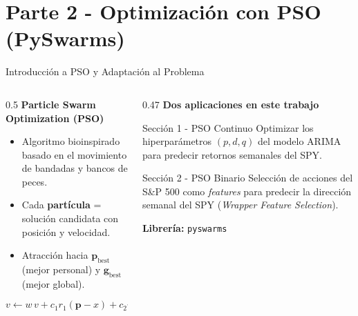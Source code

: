 \documentclass[aspectratio=169]{beamer}
\begin{document}
\section{Parte 2 - Optimización con PSO (PySwarms)}

\begin{frame}{Introducción a PSO y Adaptación al Problema}
  \begin{columns}[T]
    \begin{column}{0.5\textwidth}
      \textbf{Particle Swarm Optimization (PSO)}
      \begin{itemize}
        \item Algoritmo bioinspirado basado en el movimiento de
              bandadas y bancos de peces.
        \item Cada \textbf{partícula} = solución candidata
              con posición y velocidad.
        \item Atracción hacia $\mathbf{p}_{\text{best}}$ (mejor
              personal) y $\mathbf{g}_{\text{best}}$ (mejor global).
      \end{itemize}

      \[
        v \leftarrow w\,v + c_1 r_1(\mathbf{p} - x) + c_2 r_2(\mathbf{g} - x)
      \]
    \end{column}
    \begin{column}{0.47\textwidth}
      \textbf{Dos aplicaciones en este trabajo}

      \begin{block}{Sección 1 - PSO Continuo}
        Optimizar los hiperparámetros $(p, d, q)$ del modelo
        ARIMA para predecir retornos semanales del SPY.
      \end{block}

      \vspace{8pt}
      \begin{block}{Sección 2 - PSO Binario}
        Selección de acciones del S\&P 500 como \emph{features}
        para predecir la dirección semanal del SPY
        (\emph{Wrapper Feature Selection}).
      \end{block}

      \vspace{6pt}
      \textbf{Librería:} \texttt{pyswarms}
    \end{column}
  \end{columns}
\end{frame}
\end{document}
